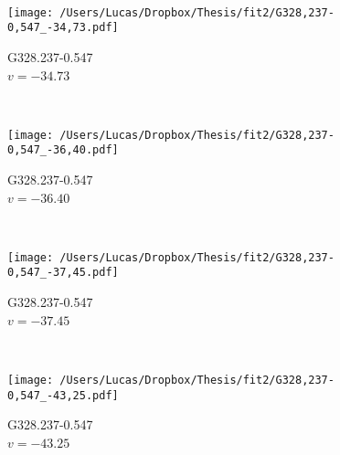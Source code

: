 \begin{figure*}[t]
\begin{subfigure}[t]{0.3\textwidth}
	\end{subfigure}
	~
	\begin{subfigure}[t]{0.3\textwidth}
		\texttt{[image: /Users/Lucas/Dropbox/Thesis/fit2/G328,237-0,547\_-34,73.pdf]}
		\caption[]{G328.237-0.547\\$v=-34.73$\,\kms}
	\end{subfigure}
	~
	\begin{subfigure}[t]{0.3\textwidth}
		\texttt{[image: /Users/Lucas/Dropbox/Thesis/fit2/G328,237-0,547\_-36,40.pdf]}
		\caption[]{G328.237-0.547\\$v=-36.40$\,\kms}
	\end{subfigure}
	~
	\begin{subfigure}[t]{0.3\textwidth}
		\texttt{[image: /Users/Lucas/Dropbox/Thesis/fit2/G328,237-0,547\_-37,45.pdf]}
		\caption[]{G328.237-0.547\\$v=-37.45$\,\kms}
	\end{subfigure}
	~
	\begin{subfigure}[t]{0.3\textwidth}
		\texttt{[image: /Users/Lucas/Dropbox/Thesis/fit2/G328,237-0,547\_-43,25.pdf]}
		\caption[]{G328.237-0.547\\$v=-43.25$\,\kms}
	\end{subfigure}
	~
\end{figure*}
\clearpage
